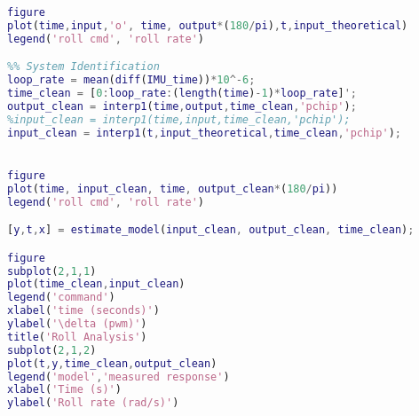 \begin{lstlisting}[language=matlab]
figure
plot(time,input,'o', time, output*(180/pi),t,input_theoretical)
legend('roll cmd', 'roll rate')

%% System Identification
loop_rate = mean(diff(IMU_time))*10^-6;
time_clean = [0:loop_rate:(length(time)-1)*loop_rate]';
output_clean = interp1(time,output,time_clean,'pchip');
%input_clean = interp1(time,input,time_clean,'pchip');
input_clean = interp1(t,input_theoretical,time_clean,'pchip');


figure
plot(time, input_clean, time, output_clean*(180/pi))
legend('roll cmd', 'roll rate')

[y,t,x] = estimate_model(input_clean, output_clean, time_clean);

figure
subplot(2,1,1)
plot(time_clean,input_clean)
legend('command')
xlabel('time (seconds)')
ylabel('\delta (pwm)')
title('Roll Analysis')
subplot(2,1,2)
plot(t,y,time_clean,output_clean)
legend('model','measured response')
xlabel('Time (s)')
ylabel('Roll rate (rad/s)')
\end{lstlisting}
